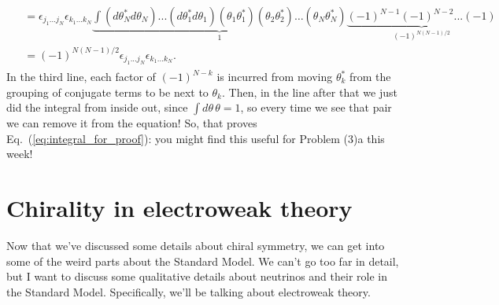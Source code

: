 \documentclass[12pt, oneside]{article}   	%
\theoremstyle{definition}
\begin{document}
\begin{itemize}
\begin{align}
\begin{split}
		&= \epsilon_{j_1 ... j_N} \epsilon_{k_1 ... k_N} \underbrace{\int (d\theta_N^* d\theta_N) ... (d\theta_1^* d\theta_1) (\theta_{1}\theta_1^*) (\theta_{2}\theta_{2}^*) \dots (\theta_{N}\theta^*_{N})}_{1}  \underbrace{(-1)^{N - 1} (-1)^{N - 2} ... (-1)}_{(-1)^{N(N - 1) / 2}} \\
		&= (-1)^{N (N - 1) / 2} \epsilon_{j_1 ... j_N} \epsilon_{k_1 ... k_N}.
	\end{split}\end{align}
	In the third line, each factor of $(-1)^{N - k}$ is incurred from moving $\theta_k^*$ from the grouping of conjugate terms to be next to $\theta_k$. Then, in the line after that we just did the integral from inside out, since $\int d\theta\, \theta = 1$, so every time we see that pair we can remove it from the equation! So, that proves Eq.~(\ref{eq:integral_for_proof}): you might find this useful for Problem (3)a this week!
	
\end{itemize}

\section*{Chirality in electroweak theory}

Now that we've discussed some details about chiral symmetry, we can get into some of the weird parts about the Standard Model. We can't go too far in detail, but I want to discuss some qualitative details about neutrinos and their role in the Standard Model. Specifically, we'll be talking about electroweak theory. 
\end{document}
